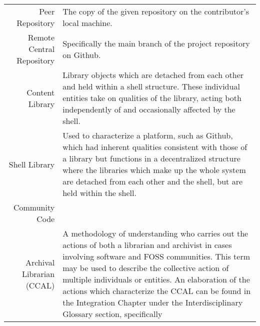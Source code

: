 \begin{center}
\begin{longtable}{r p{}}

Peer Repository & The copy of the given repository on the contributor's local machine.\\

Remote Central Repository & Specifically the main branch of the project repository on Github. \\

Content Library & Library objects which are detached from each other and held within a shell structure. These individual entities take on qualities of the library, acting both independently of and occasionally affected by the shell.  \\ 

Shell Library & Used to characterize a platform, such as Github, which had inherent qualities consistent with those of a library but functions in a decentralized structure where the libraries which make up the whole system are detached from each other and the shell, but are held within the shell. \\

Community Code\\Archival Librarian (CCAL) & A methodology of understanding who carries out the actions of both a librarian and archivist in cases involving software and FOSS communities. This term may be used to describe the collective action of multiple individuals or entities. An elaboration of the actions which characterize the CCAL can be found in the Integration Chapter under the Interdisciplinary Glossary section, specifically  \\

\end{longtable}
\end{center}